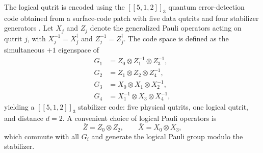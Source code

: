 The logical qutrit is encoded using the $[[5,1,2]]_3$ quantum error-detection code obtained from a surface-code patch with five data qutrits and four stabilizer generators \cite{Moussa2016}. Let
$X_j$ and $Z_j$ denote the generalized Pauli operators acting on
qutrit $j$, with $X_j^{-1}=X_j^\dagger$ and $Z_j^{-1}=Z_j^\dagger$. The
code space is defined as the simultaneous $+1$ eigenspace of
\begin{align}
  G_1 &= Z_0 \otimes Z_1^{-1} \otimes Z_3^{-1}, \label{eq:s1}\\
  G_2 &= Z_1 \otimes Z_2 \otimes Z_4^{-1}, \\
  G_3 &= X_0 \otimes X_1 \otimes X_2^{-1}, \\
  G_4 &= X_1^{-1} \otimes X_3 \otimes X_4^{-1},
  \label{eq:s4}
\end{align}
yielding a $[[5,1,2]]_3$ stabilizer code: five physical qutrits, one logical qutrit, and distance $d=2$. A convenient choice of logical Pauli operators is
\begin{equation}
  \bar Z = Z_0 \otimes Z_2, \qquad
  \bar X = X_0 \otimes X_3,
  \label{eq:logicalPauli}
\end{equation}
which commute with all $G_i$ and generate the logical Pauli group modulo the stabilizer.

